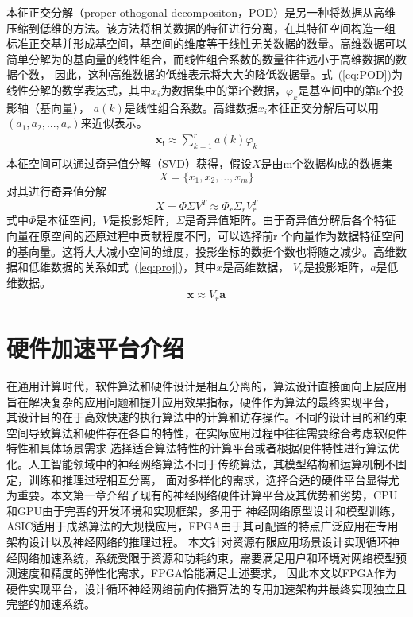 本征正交分解（proper othogonal decompositon，POD）是另一种将数据从高维压缩到低维的方法。该方法将相关数据的特征进行分离，在其特征空间构造一组
标准正交基并形成基空间，基空间的维度等于线性无关数据的数量。高维数据可以简单分解为的基向量的线性组合，而线性组合系数的数量往往远小于高维数据的数据个数，
因此，这种高维数据的低维表示将大大的降低数据量。式~(\ref{eq:POD})为线性分解的数学表达式，其中\(x_i\)为数据集中的第i个数据，\(\varphi _k\)是基空间中的第k个投影轴（基向量），
\(a(k)\)是线性组合系数。高维数据\(x_i\)本征正交分解后可以用\((a_1,a_2,...,a_r)\)来近似表示。
\begin{equation}\label{eq:POD}
	\begin{split}
		\mathbf{x_i} \approx \sum_{k=1}^{r}a(k) \varphi _k		\\
	\end{split}
\end{equation}
本征空间可以通过奇异值分解（SVD）获得，假设\(X\)是由m个数据构成的数据集
\begin{equation}
	X = \{x_1,x_2,...,x_m\}
\end{equation}
对其进行奇异值分解
\begin{equation}
	X = \Phi   \Sigma  V^T \approx \Phi _r  \Sigma _r  V_r^T
\end{equation}
式中\(\Phi\)是本征空间，\(V\)是投影矩阵，\(\Sigma\)是奇异值矩阵。由于奇异值分解后各个特征向量在原空间的还原过程中贡献程度不同，可以选择前r
个向量作为数据特征空间的基向量。这将大大减小空间的维度，投影坐标的数据个数也将随之减少。高维数据和低维数据的关系如式~(\ref{eq:proj})，其中\(x\)是高维数据，
\(V_r\)是投影矩阵，\(a\)是低维数据。
\begin{equation}\label{eq:proj}
	\mathbf{x} \approx V_r  \mathbf{a}
\end{equation}

\section{硬件加速平台介绍}
在通用计算时代，软件算法和硬件设计是相互分离的，算法设计直接面向上层应用旨在解决复杂的应用问题和提升应用效果指标，硬件作为算法的最终实现平台，
其设计目的在于高效快速的执行算法中的计算和访存操作。不同的设计目的和约束空间导致算法和硬件存在各自的特性，在实际应用过程中往往需要综合考虑软硬件特性和具体场景需求
选择适合算法特性的计算平台或者根据硬件特性进行算法优化。人工智能领域中的神经网络算法不同于传统算法，其模型结构和运算机制不固定，训练和推理过程相互分离，
面对多样化的需求，选择合适的硬件平台显得尤为重要。本文第一章介绍了现有的神经网络硬件计算平台及其优势和劣势，CPU和GPU由于完善的开发环境和实现框架，多用于
神经网络原型设计和模型训练，ASIC适用于成熟算法的大规模应用，FPGA由于其可配置的特点广泛应用在专用架构设计以及神经网络的推理过程。
本文针对资源有限应用场景设计实现循环神经网络加速系统，系统受限于资源和功耗约束，需要满足用户和环境对网络模型预测速度和精度的弹性化需求，FPGA恰能满足上述要求，
因此本文以FPGA作为硬件实现平台，设计循环神经网络前向传播算法的专用加速架构并最终实现独立且完整的加速系统。

